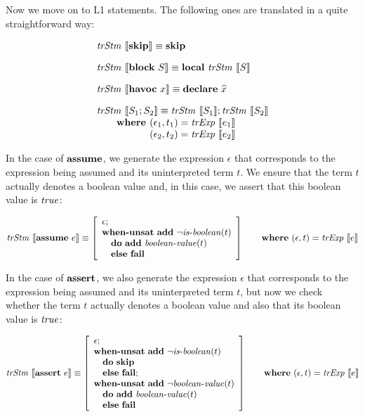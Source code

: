 Now we move on to L1 statements. The following ones are translated in a 
quite straightforward way:

\[
\begin{array}{l}
\trStm{\skipE} \equiv \skipE\\[1em]
\trStm{\blockE~S} \equiv \localE~\trStm{S}\\[1em]
\trStm{\havocE~x} \equiv \declareE{\widehat{x}}\\[1em]
\trStm{S_1;S_2} \equiv \trStm{S_1};\trStm{S_2}\\
\qquad \textbf{where }(\epsilon_1, t_1) = \trExps{e_1}\\
\qquad \phantom{\textbf{where }}(\epsilon_2, t_2) = \trExps{e_2}
\end{array}
\]

In the case of $\textbf{assume}$, we generate the expression $\epsilon$ that 
corresponds to the expression being assumed and its uninterpreted term $t$. 
We ensure that the term $t$ actually denotes a boolean value and, in this 
case, we assert that this boolean value is $\mathit{true}$:

\[
\mathit{trStm}~\llbracket\textbf{assume}~e\rrbracket \equiv 
\left[\begin{array}{l}
\epsilon;\\
\textbf{when-unsat}~\textbf{add}~\neg\mathit{is\mbox{-}boolean}(t)\\
\quad\textbf{do}~\textbf{add}~\mathit{boolean\mbox{-}value}(t)\\
\quad\textbf{else}~\textbf{fail}\\
\end{array}\right]
\qquad \textbf{where}~(\epsilon, t) = \mathit{trExp}~\llbracket e\rrbracket
\]

In the case of $\textbf{assert}$, we also generate the expression $\epsilon$ that 
corresponds to the expression being assumed and its uninterpreted term $t$, but
now we check whether the term $t$ actually denotes a boolean value and also that
its boolean value is $\mathit{true}$:

\[
\mathit{trStm}~\llbracket\textbf{assert}~e\rrbracket \equiv
\left[\begin{array}{l}
\epsilon;\\
\textbf{when-unsat}~\textbf{add}~\neg\mathit{is\mbox{-}boolean}(t)\\
\quad\textbf{do}~\textbf{skip}\\
\quad\textbf{else}~\textbf{fail};\\
\textbf{when-unsat}~\textbf{add}~\neg\mathit{boolean\mbox{-}value}(t)\\
\quad\textbf{do}~\textbf{add}~\mathit{boolean\mbox{-}value}(t)\\
\quad\textbf{else}~\textbf{fail}\\
\end{array}\right]
\qquad \textbf{where}~(\epsilon, t) = \mathit{trExp}~\llbracket e\rrbracket
\]

